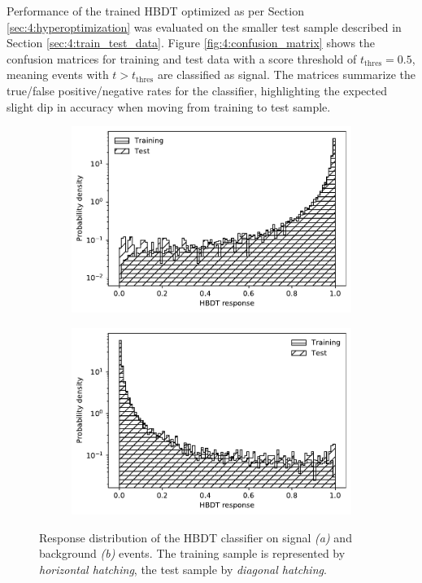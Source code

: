 Performance of the trained HBDT optimized as per Section \ref{sec:4:hyperoptimization} was evaluated on the smaller test sample described in Section \ref{sec:4:train_test_data}.
Figure \ref{fig:4:confusion_matrix} shows the confusion matrices for training and test data with a score threshold of $t_\text{thres}=0.5$, meaning events with $t>t_\text{thres}$ are classified as signal.
The matrices summarize the true/false positive/negative rates for the classifier, highlighting the expected slight dip in accuracy when moving from training to test sample.

\begin{figure}[t]
	\centering
	\begin{subfigure}{.45\textwidth}
		\includegraphics[width=\textwidth]{graphics/04-event_selection/sig_train_vs_test.pdf}
		\caption{}
		\label{fig:4:sig_train_vs_test}
	\end{subfigure}
	\begin{subfigure}{.45\textwidth}
		\includegraphics[width=\textwidth]{graphics/04-event_selection/bkg_train_vs_test.pdf}
		\caption{}
		\label{fig:4:bkg_train_vs_test}
	\end{subfigure}
	\caption{Response distribution of the HBDT classifier on signal \textit{(a)} and background \textit{(b)} events. The training sample is represented by \textit{horizontal hatching}, the test sample by \textit{diagonal hatching}.}
	\label{fig:4:train_vs_test}
\end{figure}

